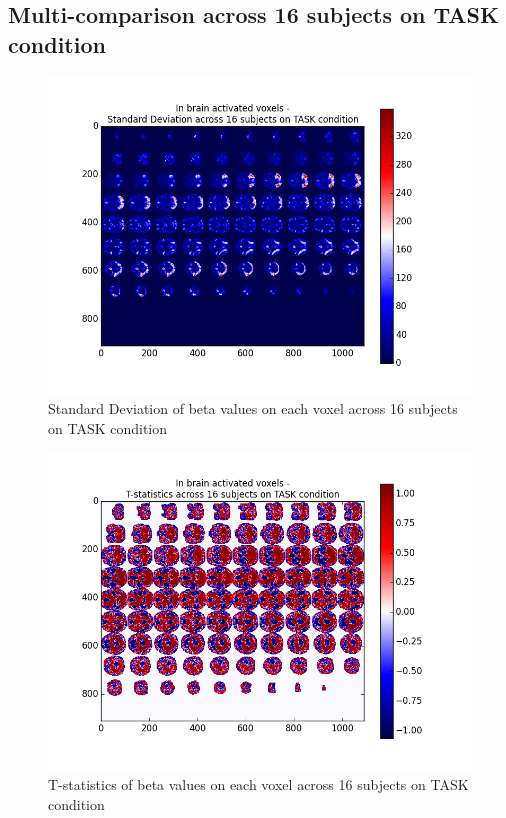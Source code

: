 \subsection{Multi-comparison across 16 subjects on TASK condition}
\begin{figure}[H] 
\centering \includegraphics[scale=0.5]{../fig/multi_beta/std_task.png}	 
\caption{Standard Deviation of beta values on each voxel across 16 subjects on TASK condition}
\end{figure} 

\begin{figure}[H] 
\centering \includegraphics[scale=0.5]{../fig/multi_beta/tstat_task.png}	 
\caption{T-statistics of beta values on each voxel across 16 subjects on TASK condition}
\end{figure} 


